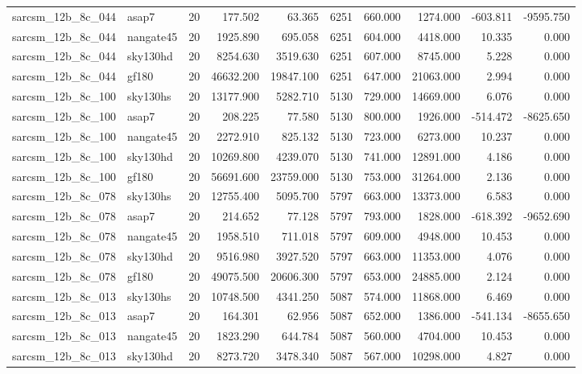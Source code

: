 \documentclass{article}
\begin{document}
\begin{longtable}{llrrrrrrrr}
sarcsm\_12b\_8c\_044 & asap7 & 20 & 177.502 & 63.365 & 6251 & 660.000 & 1274.000 & -603.811 & -9595.750 \\
sarcsm\_12b\_8c\_044 & nangate45 & 20 & 1925.890 & 695.058 & 6251 & 604.000 & 4418.000 & 10.335 & 0.000 \\
sarcsm\_12b\_8c\_044 & sky130hd & 20 & 8254.630 & 3519.630 & 6251 & 607.000 & 8745.000 & 5.228 & 0.000 \\
sarcsm\_12b\_8c\_044 & gf180 & 20 & 46632.200 & 19847.100 & 6251 & 647.000 & 21063.000 & 2.994 & 0.000 \\
sarcsm\_12b\_8c\_100 & sky130hs & 20 & 13177.900 & 5282.710 & 5130 & 729.000 & 14669.000 & 6.076 & 0.000 \\
sarcsm\_12b\_8c\_100 & asap7 & 20 & 208.225 & 77.580 & 5130 & 800.000 & 1926.000 & -514.472 & -8625.650 \\
sarcsm\_12b\_8c\_100 & nangate45 & 20 & 2272.910 & 825.132 & 5130 & 723.000 & 6273.000 & 10.237 & 0.000 \\
sarcsm\_12b\_8c\_100 & sky130hd & 20 & 10269.800 & 4239.070 & 5130 & 741.000 & 12891.000 & 4.186 & 0.000 \\
sarcsm\_12b\_8c\_100 & gf180 & 20 & 56691.600 & 23759.000 & 5130 & 753.000 & 31264.000 & 2.136 & 0.000 \\
sarcsm\_12b\_8c\_078 & sky130hs & 20 & 12755.400 & 5095.700 & 5797 & 663.000 & 13373.000 & 6.583 & 0.000 \\
sarcsm\_12b\_8c\_078 & asap7 & 20 & 214.652 & 77.128 & 5797 & 793.000 & 1828.000 & -618.392 & -9652.690 \\
sarcsm\_12b\_8c\_078 & nangate45 & 20 & 1958.510 & 711.018 & 5797 & 609.000 & 4948.000 & 10.453 & 0.000 \\
sarcsm\_12b\_8c\_078 & sky130hd & 20 & 9516.980 & 3927.520 & 5797 & 663.000 & 11353.000 & 4.076 & 0.000 \\
sarcsm\_12b\_8c\_078 & gf180 & 20 & 49075.500 & 20606.300 & 5797 & 653.000 & 24885.000 & 2.124 & 0.000 \\
sarcsm\_12b\_8c\_013 & sky130hs & 20 & 10748.500 & 4341.250 & 5087 & 574.000 & 11868.000 & 6.469 & 0.000 \\
sarcsm\_12b\_8c\_013 & asap7 & 20 & 164.301 & 62.956 & 5087 & 652.000 & 1386.000 & -541.134 & -8655.650 \\
sarcsm\_12b\_8c\_013 & nangate45 & 20 & 1823.290 & 644.784 & 5087 & 560.000 & 4704.000 & 10.453 & 0.000 \\
sarcsm\_12b\_8c\_013 & sky130hd & 20 & 8273.720 & 3478.340 & 5087 & 567.000 & 10298.000 & 4.827 & 0.000 \\

\end{longtable}
\end{document}
